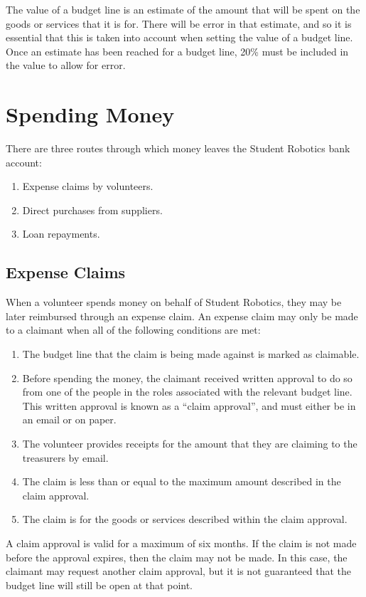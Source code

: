 The value of a budget line is an estimate of the amount that will be spent on the goods or services that it is for.  There will be error in that estimate, and so it is essential that this is taken into account when setting the value of a budget line.  Once an estimate has been reached for a budget line, 20\% must be included in the value to allow for error. 


\section{Spending Money}

There are three routes through which money leaves the Student Robotics bank account:

\begin{enumerate}
\item Expense claims by volunteers.
\item Direct purchases from suppliers.
\item Loan repayments.
\end{enumerate}

\subsection{Expense Claims}

When a volunteer spends money on behalf of Student Robotics, they may be later reimbursed through an expense claim.  An expense claim may only be made to a claimant when all of the following conditions are met:

\begin{enumerate}
\item The budget line that the claim is being made against is marked as claimable.
\item Before spending the money, the claimant received written approval to do so from one of the people in the roles associated with the relevant budget line.  This written approval is known as a ``claim approval'', and must either be in an email or on paper.
\item The volunteer provides receipts for the amount that they are claiming to the treasurers by email.
\item The claim is less than or equal to the maximum amount described in the claim approval.
\item The claim is for the goods or services described within the claim approval.
\end{enumerate}

A claim approval is valid for a maximum of six months.  If the claim is not made before the approval expires, then the claim may not be made.  In this case, the claimant may request another claim approval, but it is not guaranteed that the budget line will still be open at that point.

